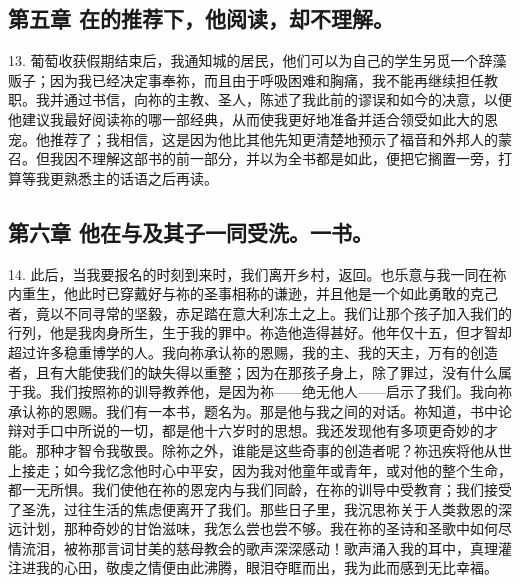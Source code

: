 
\subsection{第五章 在的推荐下，他阅读，却不理解。}

13. 葡萄收获假期结束后，我通知城的居民，他们可以为自己的学生另觅一个辞藻贩子；因为我已经决定事奉祢，而且由于呼吸困难和胸痛，我不能再继续担任教职。我并通过书信，向祢的主教、圣人，陈述了我此前的谬误和如今的决意，以便他建议我最好阅读祢的哪一部经典，从而使我更好地准备并适合领受如此大的恩宠。他推荐了；我相信，这是因为他比其他先知更清楚地预示了福音和外邦人的蒙召。但我因不理解这部书的前一部分，并以为全书都是如此，便把它搁置一旁，打算等我更熟悉主的话语之后再读。\par


\subsection{第六章 他在与及其子一同受洗。一书。}

14. 此后，当我要报名的时刻到来时，我们离开乡村，返回。也乐意与我一同在祢内重生，他此时已穿戴好与祢的圣事相称的谦逊，并且他是一个如此勇敢的克己者，竟以不同寻常的坚毅，赤足踏在意大利冻土之上。我们让那个孩子加入我们的行列，他是我肉身所生，生于我的罪中。祢造他造得甚好。他年仅十五，但才智却超过许多稳重博学的人。我向祢承认祢的恩赐，我的主、我的天主，万有的创造者，且有大能使我们的缺失得以重整；因为在那孩子身上，除了罪过，没有什么属于我。我们按照祢的训导教养他，是因为祢——绝无他人——启示了我们。我向祢承认祢的恩赐。我们有一本书，题名为。那是他与我之间的对话。祢知道，书中论辩对手口中所说的一切，都是他十六岁时的思想。我还发现他有多项更奇妙的才能。那种才智令我敬畏。除祢之外，谁能是这些奇事的创造者呢？祢迅疾将他从世上接走；如今我忆念他时心中平安，因为我对他童年或青年，或对他的整个生命，都一无所惧。我们使他在祢的恩宠内与我们同龄，在祢的训导中受教育；我们接受了圣洗，过往生活的焦虑便离开了我们。那些日子里，我沉思祢关于人类救恩的深远计划，那种奇妙的甘饴滋味，我怎么尝也尝不够。我在祢的圣诗和圣歌中如何尽情流泪，被祢那言词甘美的慈母教会的歌声深深感动！歌声涌入我的耳中，真理灌注进我的心田，敬虔之情便由此沸腾，眼泪夺眶而出，我为此而感到无比幸福。\par

